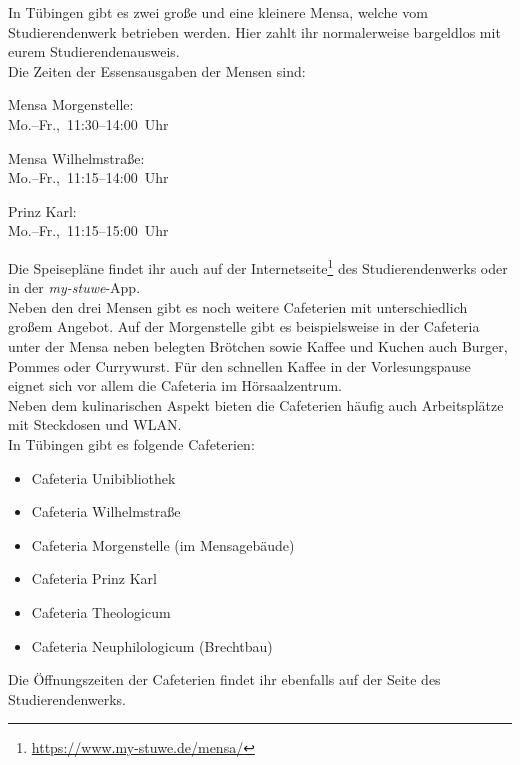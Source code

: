 
In Tübingen gibt es zwei große und eine kleinere Mensa, welche vom
Studierendenwerk betrieben werden. Hier zahlt ihr normalerweise bargeldlos mit
eurem Studierendenausweis.\\ Die Zeiten der Essensausgaben der Mensen sind:
\begin{center}

Mensa Morgenstelle:\\
Mo.--Fr.,~11:30--14:00~Uhr

\bigskip

Mensa Wilhelmstraße:\\
Mo.--Fr.,~11:15--14:00~Uhr

\bigskip

\nopagebreak
Prinz Karl:\\
Mo.--Fr.,~11:15--15:00~Uhr\\

\end{center}

Die Speisepläne findet ihr auch auf der
Internetseite\footnote{\url{https://www.my-stuwe.de/mensa/}} des
Studierendenwerks oder in der \emph{my-stuwe}-App.\\

Neben den drei Mensen gibt es noch weitere Cafeterien mit unterschiedlich
großem Angebot. Auf der Morgenstelle gibt es beispielsweise in der Cafeteria
unter der Mensa neben belegten Brötchen sowie Kaffee und Kuchen auch Burger,
Pommes oder Currywurst. Für den schnellen Kaffee in der Vorlesungspause eignet
sich vor allem die Cafeteria im Hörsaalzentrum.\\ Neben dem kulinarischen
Aspekt bieten die Cafeterien häufig auch Arbeitsplätze mit Steckdosen und
WLAN.\\
In Tübingen gibt es folgende Cafeterien:
\begin{itemize}
	\setlength\itemsep{0.3em}
	\item Cafeteria Unibibliothek
	\item Cafeteria Wilhelmstraße
	\item Cafeteria Morgenstelle (im Mensagebäude)
	\item Cafeteria Prinz Karl
	\item Cafeteria Theologicum
	\item Cafeteria Neuphilologicum (Brechtbau)
\end{itemize} Die Öffnungszeiten der Cafeterien findet ihr ebenfalls auf der
Seite des Studierendenwerks.
